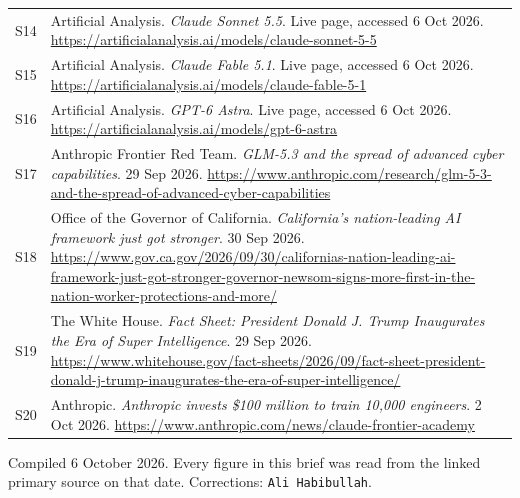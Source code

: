 \documentclass[11pt,a4paper]{article}
\newcommand{\briefdate}{6 October 2026}
\newcommand{\briefauthor}{Ali Habibullah}
\begin{document}
{\begin{tabularx}{\textwidth}{@{}l X@{}}
S14 & Artificial Analysis. \emph{Claude Sonnet 5.5}. Live page, accessed 6 Oct 2026. \url{https://artificialanalysis.ai/models/claude-sonnet-5-5} \\
S15 & Artificial Analysis. \emph{Claude Fable 5.1}. Live page, accessed 6 Oct 2026. \url{https://artificialanalysis.ai/models/claude-fable-5-1} \\
S16 & Artificial Analysis. \emph{GPT-6 Astra}. Live page, accessed 6 Oct 2026. \url{https://artificialanalysis.ai/models/gpt-6-astra} \\
S17 & Anthropic Frontier Red Team. \emph{GLM-5.3 and the spread of advanced cyber capabilities}. 29 Sep 2026. \url{https://www.anthropic.com/research/glm-5-3-and-the-spread-of-advanced-cyber-capabilities} \\
S18 & Office of the Governor of California. \emph{California's nation-leading AI framework just got stronger}. 30 Sep 2026. \url{https://www.gov.ca.gov/2026/09/30/californias-nation-leading-ai-framework-just-got-stronger-governor-newsom-signs-more-first-in-the-nation-worker-protections-and-more/} \\
S19 & The White House. \emph{Fact Sheet: President Donald J. Trump Inaugurates the Era of Super Intelligence}. 29 Sep 2026. \url{https://www.whitehouse.gov/fact-sheets/2026/09/fact-sheet-president-donald-j-trump-inaugurates-the-era-of-super-intelligence/} \\
S20 & Anthropic. \emph{Anthropic invests \$100 million to train 10,000 engineers}. 2 Oct 2026. \url{https://www.anthropic.com/news/claude-frontier-academy} \\
\bottomrule
\end{tabularx}}

\vspace{0.8em}
{\footnotesize\color{brandgrey}
Compiled \briefdate. Every figure in this brief was read from the linked primary
source on that date. Corrections: \texttt{\briefauthor}.}
\end{document}
